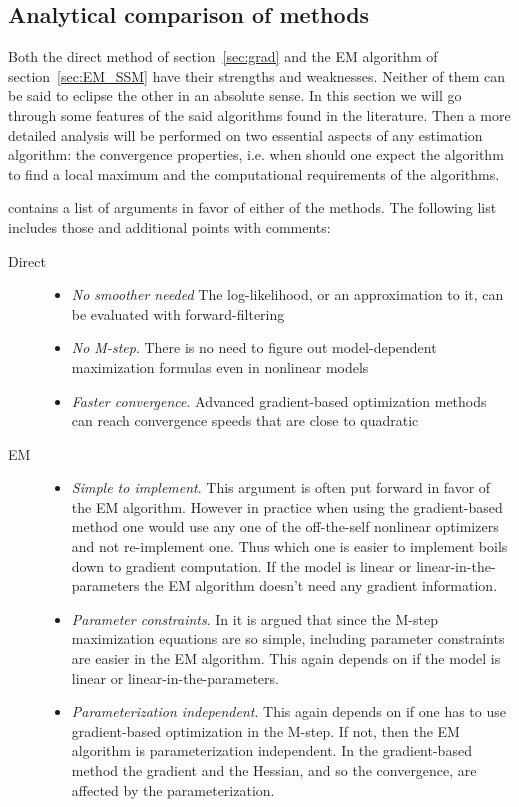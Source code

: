 
\subsection{Analytical comparison of methods}

Both the direct method of section~\ref{sec:grad} and the EM algorithm of section~\ref{sec:EM_SSM}
have their strengths and weaknesses. Neither of them can be said to eclipse the other in an absolute sense.
In this section we will go through some features of the said algorithms found in the literature.
Then a more detailed analysis will be performed on two essential aspects of any estimation algorithm:
the convergence properties, i.e. when should one expect the algorithm to find a local maximum and
the computational requirements of the algorithms.

\textcite{Cappe2005} contains a list of arguments in favor of either of the methods. The following list includes
those and additional points with comments:
\begin{description}
  \item[Direct]\hfill
\begin{itemize}
  \item\emph{No smoother needed} The log-likelihood, or an approximation to it, can be evaluated
  with forward-filtering
  \item\emph{No M-step}. There is no need to figure out model-dependent maximization
  formulas even in nonlinear models 
  \item\emph{Faster convergence}. Advanced gradient-based optimization
  methods can reach convergence speeds that are close to quadratic
\end{itemize}
  \item[EM]\hfill
  \begin{itemize}
  \item \emph{Simple to implement}. This argument is often put forward in favor of the EM
 algorithm. However in practice when using the gradient-based method one would use any one of
the off-the-self nonlinear optimizers and not re-implement one. Thus which one is easier to implement
boils down to gradient computation. If the model is linear or linear-in-the-parameters the EM
algorithm doesn't need any gradient information.
  \item\emph{Parameter constraints}. In \textcite{Cappe2005} it is argued that
since the M-step maximization equations are so simple, including parameter constraints
are easier in the EM algorithm. This again depends on if the model is linear or linear-in-the-parameters.
  \item\emph{Parameterization independent}. This again depends on if one has to use gradient-based
 optimization in the M-step. If not, then the EM algorithm is parameterization independent. In the gradient-based
 method the gradient and the Hessian, and so the convergence, are affected by the parameterization.
\end{itemize} 
\end{description}


